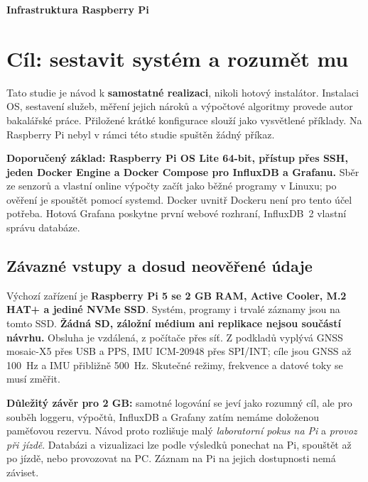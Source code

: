 \documentclass[11pt,a4paper]{article}
\begin{document}
\par\vspace{0.7em}
{\LARGE\bfseries Infrastruktura Raspberry Pi\par}
\vspace{0.5em}\par\vspace{0.8em}

\section{Cíl: sestavit systém a rozumět mu}
Tato studie je návod k \textbf{samostatné realizaci}, nikoli hotový instalátor. Instalaci OS, sestavení služeb, měření jejich nároků a výpočtové algoritmy provede autor bakalářské práce. Přiložené krátké konfigurace slouží jako vysvětlené příklady. Na Raspberry Pi nebyl v rámci této studie spuštěn žádný příkaz.

\textbf{Doporučený základ: Raspberry Pi OS Lite 64-bit, přístup přes SSH, jeden Docker Engine a Docker Compose pro InfluxDB a Grafanu.} Sběr ze senzorů a vlastní online výpočty začít jako běžné programy v Linuxu; po ověření je spouštět pomocí systemd. Docker uvnitř Dockeru není pro tento účel potřeba. Hotová Grafana poskytne první webové rozhraní, InfluxDB~2 vlastní správu databáze.

\subsection{Závazné vstupy a dosud neověřené údaje}
Výchozí zařízení je \textbf{Raspberry Pi 5 se 2 GB RAM, Active Cooler, M.2 HAT+ a jediné NVMe SSD}. Systém, programy i trvalé záznamy jsou na tomto SSD. \textbf{Žádná SD, záložní médium ani replikace nejsou součástí návrhu.} Obsluha je vzdálená, z počítače přes síť. Z podkladů vyplývá GNSS mosaic-X5 přes USB a PPS, IMU ICM-20948 přes SPI/INT; cíle jsou GNSS až 100~Hz a IMU přibližně 500~Hz. Skutečné režimy, frekvence a datové toky se musí změřit.\cite{projekt}

\textbf{Důležitý závěr pro 2 GB:} samotné logování se jeví jako rozumný cíl, ale pro souběh loggeru, výpočtů, InfluxDB a Grafany zatím nemáme doloženou paměťovou rezervu. Návod proto rozlišuje malý \emph{laboratorní pokus na Pi} a \emph{provoz při jízdě}. Databázi a vizualizaci lze podle výsledků ponechat na Pi, spouštět až po jízdě, nebo provozovat na PC. Záznam na Pi na jejich dostupnosti nemá záviset.
\end{document}
